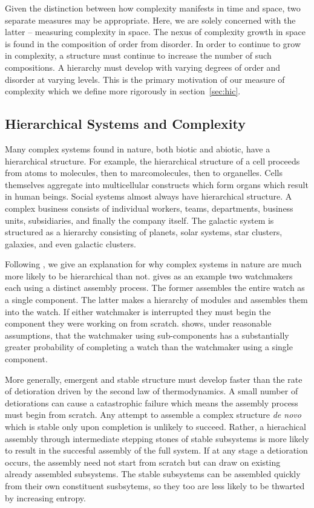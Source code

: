 Given the distinction between how complexity manifests in time and space, two
separate measures may be appropriate. Here, we are solely concerned with the
latter -- measuring complexity in space. The nexus of complexity growth in space
is found in the composition of order from disorder. In order to continue to
grow in complexity, a structure must continue to increase the number of such
compositions. A hierarchy must develop with varying degrees of order and
disorder at varying levels. This is the primary motivation of our measure of
complexity which we define more rigorously in section~\ref{sec:hic}.

\subsection{Hierarchical Systems and Complexity}
\label{sec:hierarchy_and_complexity}

Many complex systems found in nature, both biotic and abiotic, have a
hierarchical structure. For example, the hierarchical structure of a cell
proceeds from atoms to molecules, then to marcomolecules, then
to organelles. Cells themselves aggregate into multicellular constructs which form
organs which result in human beings. Social systems almost always have
hierarchical structure. A complex business consists of individual workers,
teams, departments, business units, subsidiaries, and finally the company itself.
The galactic system is structured as a hierarchy consisting of
planets, solar systems, star clusters, galaxies, and even galactic clusters.

Following \citet{simon1991architecture}, we give an explanation for why complex
systems in nature are much more likely to be hierarchical than not.
\citet{simon1991architecture} gives as an example two watchmakers each using a
distinct assembly process. The former assembles the entire watch as a single
component. The latter makes a hierarchy of modules and assembles them into the
watch. If either watchmaker is interrupted they must begin the component they
were working on from scratch. \citet{simon1991architecture} shows, under
reasonable assumptions, that the watchmaker using sub-components has a
substantially greater probability of completing a watch than the watchmaker
using a single component.

More generally, emergent and stable structure must develop faster than the rate
of detioration driven by the second law of thermodynamics. A small number of
detiorations can cause a catastrophic failure which means the assembly process
must begin from scratch. Any attempt to assemble a complex structure \emph{de
novo} which is stable only upon completion is unlikely to succeed. Rather, a
hierachical assembly through intermediate stepping stones of stable subsystems
is more likely to result in the succesful assembly of the full system. If at
any stage a detioration occurs, the assembly need not start from scratch but
can draw on existing already assembled subsystems. The stable subsystems can be
assembled quickly from their own constituent susbsytems, so they too are less
likely to be thwarted by increasing entropy.

